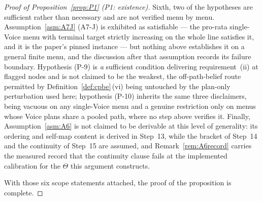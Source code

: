\begin{proof}[Proof of Proposition~\ref{prop:P1} (P1: existence)]
Sixth, two of the hypotheses are sufficient rather than necessary and are not verified menu by menu.
Assumption~\ref{asm:A7J} (A7-J) is exhibited as satisfiable --- the pro-rata single-Voice menu with terminal
target strictly increasing on the whole line satisfies it, and it is the paper's pinned instance ---
but nothing above establishes it on a general finite menu, and the discussion after that assumption
records its failure boundary. Hypothesis (P-9) is \emph{a} sufficient condition delivering
requirement~(ii) at flagged nodes and is not claimed to be the weakest, the off-path-belief route
permitted by Definition~\ref{def:cpbe}\,(vi) being untouched by the plan-only perturbation used here;
hypothesis (P-10) inherits the same three disclaimers, being vacuous on any single-Voice menu and a
genuine restriction only on menus whose Voice plans share a pooled path, where no step above verifies
it. Finally, Assumption~\ref{asm:A6} is not claimed to be derivable at this level of generality: its
ordering and self-map content is derived in Step~13, while the bracket of Step~14 and the continuity
of Step~15 are assumed, and Remark~\ref{rem:A6record} carries the measured record that the continuity
clause fails at the implemented calibration for the $\Theta$ this argument constructs.

\medskip
With those six scope statements attached, the proof of the proposition is complete.
\end{proof}
